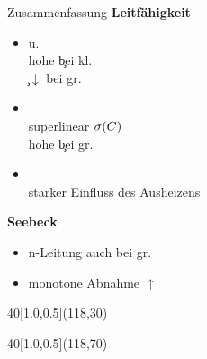 \begin{frame}{Zusammenfassung}{}%
{\bfseries Leitfähigkeit}\par
\begin{itemize}
\item \CrPd u. \WPd
\\hohe \c bei kl. \C
\\\c$\downarrow$ bei gr. \C
%
\item \dmbi \\superlinear $\c(\C)$ \\ hohe \c bei gr. \C
\item \aob \\ starker Einfluss des Ausheizens
\end{itemize}
%
\vspace*{1ex}
{\bfseries Seebeck}\par
\begin{itemize}
\item n-Leitung auch bei gr. \C
\item monotone Abnahme \Pfeil \n $\uparrow$
\end{itemize}
%
\begin{textblock}{40}[1.0,0.5](118,30)%
\end{textblock}
%
\begin{textblock}{40}[1.0,0.5](118,70)%
\end{textblock}
\end{frame}


